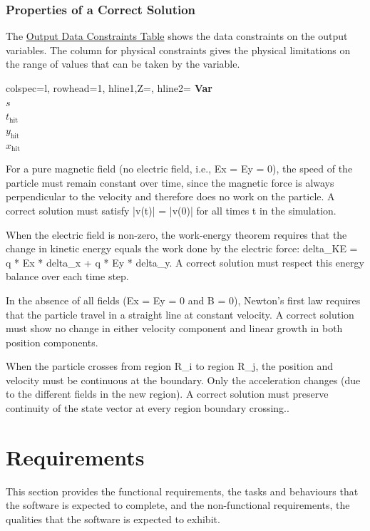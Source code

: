 \documentclass[12pt]{article}
\begin{document}
\subsubsection{Properties of a Correct Solution}
\label{Sec:CorSolProps}
The \hyperref[Table:OutDataConstraints]{Output Data Constraints Table} shows the data constraints on the output variables. The column for physical constraints gives the physical limitations on the range of values that can be taken by the variable.

\begin{longtblr}
[caption={Output Data Constraints}]
{colspec={l}, rowhead=1, hline{1,Z}=\heavyrulewidth, hline{2}=\lightrulewidth}
\textbf{Var}
\\
$s$
\\
${t_{\text{hit}}}$
\\
${y_{\text{hit}}}$
\\
${x_{\text{hit}}}$
\label{Table:OutDataConstraints}
\end{longtblr}
For a pure magnetic field (no electric field, i.e., Ex = Ey = 0), the speed of the particle must remain constant over time, since the magnetic force is always perpendicular to the velocity and therefore does no work on the particle. A correct solution must satisfy |v(t)| = |v(0)| for all times t in the simulation.

When the electric field is non-zero, the work-energy theorem requires that the change in kinetic energy equals the work done by the electric force: delta\_KE = q * Ex * delta\_x + q * Ey * delta\_y. A correct solution must respect this energy balance over each time step.

In the absence of all fields (Ex = Ey = 0 and B = 0), Newton's first law requires that the particle travel in a straight line at constant velocity. A correct solution must show no change in either velocity component and linear growth in both position components.

When the particle crosses from region R\_i to region R\_j, the position and velocity must be continuous at the boundary. Only the acceleration changes (due to the different fields in the new region). A correct solution must preserve continuity of the state vector at every region boundary crossing..

\section{Requirements}
\label{Sec:Requirements}
This section provides the functional requirements, the tasks and behaviours that the software is expected to complete, and the non-functional requirements, the qualities that the software is expected to exhibit.
\end{document}
